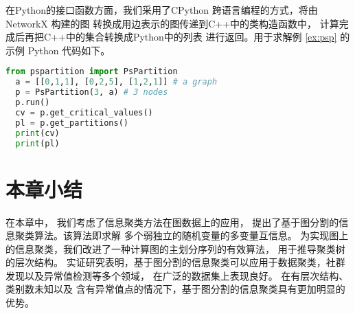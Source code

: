 在Python的接口函数方面，我们采用了CPython
跨语言编程的方式，将由 NetworkX \cite{SciPyProceedings_11} 构建的图
转换成用边表示的图传递到C++中的类构造函数中，
计算完成后再把C++中的集合转换成Python中的列表
进行返回。用于求解例 \ref{ex:psp}
的示例 Python 代码如下。
\begin{lstlisting}[language=Python]
  from pspartition import PsPartition
  a = [[0,1,1], [0,2,5], [1,2,1]] # a graph
  p = PsPartition(3, a) # 3 nodes
  p.run()  
  cv = p.get_critical_values()
  pl = p.get_partitions()
  print(cv)
  print(pl)
  \end{lstlisting}

\section{本章小结}
在本章中，
我们考虑了信息聚类方法在图数据上的应用，
提出了基于图分割的信息聚类算法。该算法即求解
多个弱独立的随机变量的多变量互信息。
为实现图上的信息聚类，我们改进了一种计算图的主划分序列的有效算法，
用于推导聚类树的层次结构。
实证研究表明，基于图分割的信息聚类可以应用于数据聚类，社群发现以及异常值检测等多个领域，
在广泛的数据集上表现良好。
在有层次结构、类别数未知以及
含有异常值点的情况下，基于图分割的信息聚类具有更加明显的优势。
